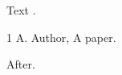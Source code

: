 \documentclass{article}
\begin{document}
Text \citep{a}.
\begin{thebibliography}{1}
 A. Author, A paper.
\end{thebibliography}
After.
\end{document}
